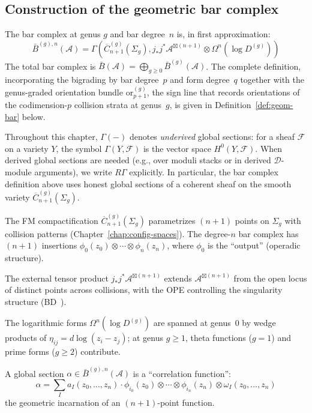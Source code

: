 \subsection{Construction of the geometric bar complex}

\begin{definition}
\label{def:geom-bar-preview}
The bar complex at genus $g$ and bar degree~$n$ is, in first
approximation:
\[\bar{B}^{(g),n}(\mathcal{A}) = \Gamma\left(\overline{C}_{n+1}^{(g)}(\Sigma_g), j_*j^*\mathcal{A}^{\boxtimes(n+1)} \otimes \Omega^n(\log D^{(g)})\right)\]
The total bar complex is
$\bar{B}(\mathcal{A}) = \bigoplus_{g \geq 0} \bar{B}^{(g)}(\mathcal{A})$.
The complete definition, incorporating the bigrading by bar
degree~$p$ and form degree~$q$ together with the genus-graded
orientation bundle $\mathrm{or}_{p+1}^{(g)}$, the sign line that records
orientations of the codimension-$p$ collision strata at genus~$g$, is given in
Definition~\ref{def:geom-bar} below.
\end{definition}

\begin{convention}\label{conv:gamma-vs-rgamma}
Throughout this chapter, $\Gamma(-)$ denotes \emph{underived} global sections:
for a sheaf $\mathcal{F}$ on a variety $Y$, the symbol $\Gamma(Y, \mathcal{F})$
is the vector space $H^0(Y, \mathcal{F})$. When derived global sections are
needed (e.g., over moduli stacks or in derived $\mathcal{D}$-module arguments),
we write $R\Gamma$ explicitly. In particular, the bar complex definition above
uses honest global sections of a coherent sheaf on the smooth variety
$\overline{C}_{n+1}^{(g)}(\Sigma_g)$.
\end{convention}

\begin{remark}\label{rem:unpacking-bar-def}
The FM compactification $\overline{C}_{n+1}^{(g)}(\Sigma_g)$ parametrizes $(n+1)$ points on $\Sigma_g$ with collision patterns (Chapter~\ref{chap:config-spaces}). The degree-$n$ bar complex has $(n+1)$ insertions $\phi_0(z_0) \otimes \cdots \otimes \phi_n(z_n)$, where $\phi_0$ is the ``output'' (operadic structure).

The external tensor product $j_*j^*\mathcal{A}^{\boxtimes(n+1)}$ extends $\mathcal{A}^{\boxtimes(n+1)}$ from the open locus of distinct points across collisions, with the OPE controlling the singularity structure (BD~\cite[\S3.4.14--3.4.22]{BD04}).

The logarithmic forms $\Omega^n(\log D^{(g)})$ are spanned at genus~$0$ by wedge products of $\eta_{ij} = d\log(z_i - z_j)$; at genus $g \geq 1$, theta functions ($g=1$) and prime forms ($g \geq 2$) contribute.

A global section $\alpha \in \bar{B}^{(g),n}(\mathcal{A})$ is a ``correlation function'':
\[\alpha = \sum_I a_I(z_0, \ldots, z_n) \cdot \phi_{i_0}(z_0) \otimes \cdots \otimes \phi_{i_n}(z_n) \otimes \omega_I(z_0, \ldots, z_n)\]
the geometric incarnation of an $(n+1)$-point function.
\end{remark}

